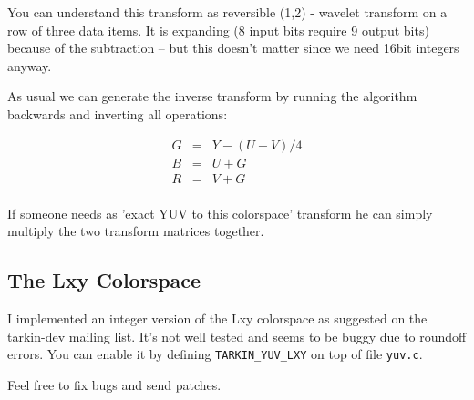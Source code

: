 You can understand this transform as reversible (1,2) - wavelet transform on a row
of three data items. It is expanding (8 input bits require 9 output bits) because
of the subtraction -- but this doesn't matter since we need 16bit integers anyway.

As usual we can generate the inverse transform by running the algorithm
backwards and inverting all operations:

\begin{eqnarray}
G &=& Y - (U + V) / 4                                \nonumber\\
B &=& U + G                                          \nonumber\\
R &=& V + G                                          \nonumber\\
\nonumber
\end{eqnarray}

If someone needs as 'exact YUV to this colorspace' transform he can simply 
multiply the two transform matrices together.

\subsection{ The Lxy Colorspace }

I implemented an integer version of the Lxy colorspace as suggested on the
tarkin-dev mailing list. It's not well tested and seems to be buggy due to
roundoff errors.
You can enable it by defining \verb|TARKIN_YUV_LXY| on top of file \verb|yuv.c|.

Feel free to fix bugs and send patches.



